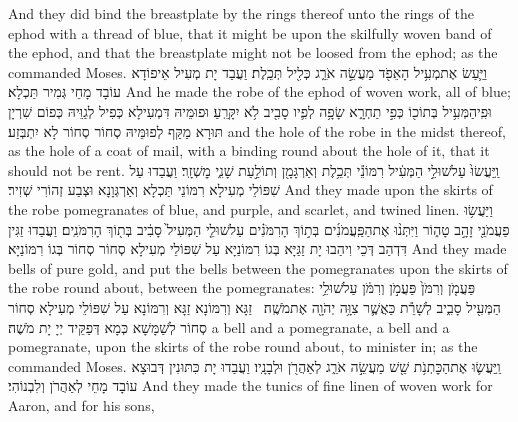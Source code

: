 {And they did bind the breastplate by the rings thereof unto the rings of the ephod with a thread of blue, that it might be upon the skilfully woven band of the ephod, and that the breastplate might not be loosed from the ephod; as the \lord\space commanded Moses.}{}
{וַיַּ֛עַשׂ אֶת\maqqaf מְעִ֥יל הָאֵפֹ֖ד מַעֲשֵׂ֣ה אֹרֵ֑ג כְּלִ֖יל תְּכֵֽלֶת׃}
{וַעֲבַד יָת מְעִיל אֵיפוֹדָא עוֹבָד מָחֵי גְּמִיר תַּכְלָא׃}
{And he made the robe of the ephod of woven work, all of blue;}{}
{וּפִֽי\maqqaf הַמְּעִ֥יל בְּתוֹכ֖וֹ כְּפִ֣י תַחְרָ֑א שָׂפָ֥ה לְפִ֛יו סָבִ֖יב לֹ֥א יִקָּרֵֽעַ׃}
{וּפוּמֵּיהּ דִּמְעִילָא כְּפִיל לְגַוֵּיהּ כְּפוֹם שִׁרְיָן תּוּרָא מַקַּף לְפוּמֵּיהּ סְחוֹר סְחוֹר לָא יִתְבְּזַע׃}
{and the hole of the robe in the midst thereof, as the hole of a coat of mail, with a binding round about the hole of it, that it should not be rent.}{}
{וַֽיַּעֲשׂוּ֙ עַל\maqqaf שׁוּלֵ֣י הַמְּעִ֔יל רִמּוֹנֵ֕י תְּכֵ֥לֶת וְאַרְגָּמָ֖ן וְתוֹלַ֣עַת שָׁנִ֑י מׇשְׁזָֽר׃}
{וַעֲבַדוּ עַל שִׁפּוֹלֵי מְעִילָא רִמּוֹנֵי תַּכְלָא וְאַרְגְּוָנָא וּצְבַע זְהוֹרִי שְׁזִיר׃}
{And they made upon the skirts of the robe pomegranates of blue, and purple, and scarlet, and twined linen.}{}
{וַיַּעֲשׂ֥וּ פַעֲמֹנֵ֖י זָהָ֣ב טָה֑וֹר וַיִּתְּנ֨וּ אֶת\maqqaf הַפַּֽעֲמֹנִ֜ים בְּת֣וֹךְ הָרִמֹּנִ֗ים עַל\maqqaf שׁוּלֵ֤י הַמְּעִיל֙ סָבִ֔יב בְּת֖וֹךְ הָרִמֹּנִֽים׃}
{וַעֲבַדוּ זַגִּין דִּדְהַב דְּכֵי וִיהַבוּ יָת זַגַּיָּא בְּגוֹ רִמּוֹנַיָּא עַל שִׁפּוֹלֵי מְעִילָא סְחוֹר סְחוֹר בְּגוֹ רִמּוֹנַיָּא׃}
{And they made bells of pure gold, and put the bells between the pomegranates upon the skirts of the robe round about, between the pomegranates:}{}
{פַּעֲמֹ֤ן וְרִמֹּן֙ פַּעֲמֹ֣ן וְרִמֹּ֔ן עַל\maqqaf שׁוּלֵ֥י הַמְּעִ֖יל סָבִ֑יב לְשָׁרֵ֕ת כַּאֲשֶׁ֛ר צִוָּ֥ה יְהֹוָ֖ה אֶת\maqqaf מֹשֶֽׁה׃ \setuma }
{זַגָּא וְרִמּוֹנָא זַגָּא וְרִמּוֹנָא עַל שִׁפּוֹלֵי מְעִילָא סְחוֹר סְחוֹר לְשַׁמָּשָׁא כְּמָא דְּפַקֵּיד יְיָ יָת מֹשֶׁה׃}
{a bell and a pomegranate, a bell and a pomegranate, upon the skirts of the robe round about, to minister in; as the \lord\space commanded Moses.}{}
{וַֽיַּעֲשׂ֛וּ אֶת\maqqaf הַכׇּתְנֹ֥ת שֵׁ֖שׁ מַעֲשֵׂ֣ה אֹרֵ֑ג לְאַהֲרֹ֖ן וּלְבָנָֽיו׃}
{וַעֲבַדוּ יָת כִּתּוּנִין דְּבוּצָא עוֹבָד מָחֵי לְאַהֲרֹן וְלִבְנוֹהִי׃}
{And they made the tunics of fine linen of woven work for Aaron, and for his sons,}{}
